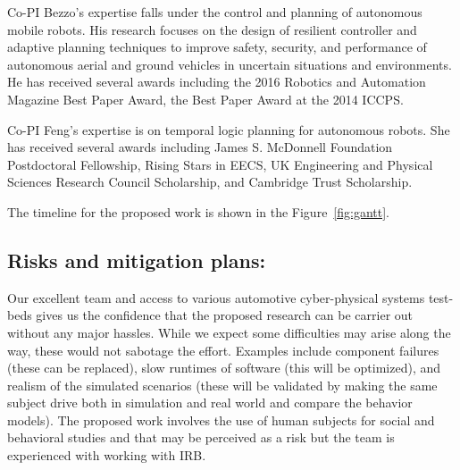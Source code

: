 Co-PI Bezzo's expertise falls under the control and planning of autonomous mobile robots. His research focuses on the design of resilient controller and adaptive planning techniques to improve safety, security, and performance of autonomous aerial and ground vehicles in uncertain situations and environments. He has received several awards including the 2016 Robotics and Automation Magazine Best Paper Award, the Best Paper Award at the 2014 ICCPS. 

Co-PI Feng's expertise is on temporal logic planning for autonomous robots. She has received several awards including James S. McDonnell Foundation Postdoctoral Fellowship, Rising Stars in EECS, UK Engineering and Physical Sciences Research Council Scholarship, and Cambridge Trust Scholarship.


The timeline for the proposed work  is shown in the Figure~\ref{fig:gantt}.



\subsection{Risks and mitigation plans:}

Our excellent team and access to various automotive cyber-physical systems test-beds gives us the confidence that the proposed research can be carrier out without any major hassles. While we expect some difficulties may arise along the way, these would not sabotage the effort. Examples include component failures (these can be replaced), slow runtimes of software (this will be optimized), and realism of the simulated scenarios (these will be validated by making the same subject drive both in simulation and real world and compare the behavior models). The proposed work involves the use of human subjects for social and behavioral studies and that may be perceived as a risk but the team is experienced with working with IRB.

